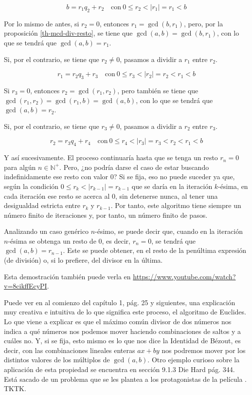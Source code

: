 $$ b = r_1q_2 + r_2 \quad \text{con} \ 0 \leq r_2 < |r_1| = r_1 < b $$

Por lo mismo de antes, si $r_2 = 0$, entonces $r_1 = \gcd(b, r_1)$, pero,
por la proposición \ref{th-mcd-div-resto}, se tiene que $\gcd(a, b) =
\gcd(b, r_1)$, con lo que se tendrá que $\gcd(a, b) = r_1$.

Si, por el contrario, se tiene que $r_2 \neq 0$, pasamos a dividir a $r_1$
entre $r_2$.

$$ r_1 = r_2q_3 + r_3 \quad \text{con} \ 0 \leq r_3 < |r_2| = r_2 < r_1 < b
$$

Si $r_3 = 0$, entonces $r_2 = \gcd(r_1, r_2)$, pero también se tiene que
$\gcd(r_1, r_2) = \gcd(r_1, b) = \gcd(a, b)$, con lo que se tendrá que
$\gcd(a, b) = r_2$.

Si, por el contrario, se tiene que $r_3 \neq 0$, pasamos a dividir a $r_2$
entre $r_3$.

$$ r_2 = r_3q_4 + r_4 \quad \text{con} \ 0 \leq r_4 < |r_3| = r_3 < r_2 <
r_1 < b $$

\noindent Y así sucesivamente. El proceso continuaría hasta que se tenga un
resto $r_n = 0$ para algún $n \in \mathbb{N}^{+}$. Pero, ¿no podría darse el
caso de estar buscando indefinidamente ese resto con valor 0? Si se fija,
eso no puede suceder ya que, según la condición $0 \leq r_k < |r_{k-1}| =
r_{k-1}$ que se daría en la iteración $k$-ésima, en cada iteración ese resto
se acerca al 0, sin detenerse nunca, al tener una desigualdad estricta entre
$r_k$ y $r_{k-1}$. Por tanto, este algoritmo tiene siempre un número finito
de iteraciones y, por tanto, un número finito de pasos.

Analizando un caso genérico $n$-ésimo, se puede decir que, cuando en la
iteración $n$-ésima se obtenga un resto de 0, es decir, $r_n = 0$, se tendrá
que $\gcd(a, b) = r_{n-1}$. Este se puede obtener, en el resto de la
penúltima expresión (de división) o, si lo prefiere, del divisor en la
última.

Esta demostración también puede verla en
\url{https://www.youtube.com/watch?v=8cikffEcyPI}.

Puede ver en \cite{weissman} al comienzo del capítulo 1, pág. 25
y siguientes, una explicación muy creativa e intuitiva de lo que significa
este proceso, el algoritmo de Euclides. Lo que viene a explicar es que el
máximo común divisor de dos números nos indica a qué números nos podemos
mover haciendo combinaciones de saltos y a cuáles no. Y, si se fija, esto
mismo es lo que nos dice la Identidad de Bézout, es decir, con las
combinaciones lineales enteras $ax + by$ nos podremos mover por los
distintos valores de los múltiplos de $\gcd(a, b)$. Otro ejemplo curioso
sobre la aplicación de esta propiedad se encuentra en
\cite{leighton} sección 9.1.3 Die Hard pág. 344. Está sacado de un
problema que se les plantea a los protagonistas de la película . TKTK.

